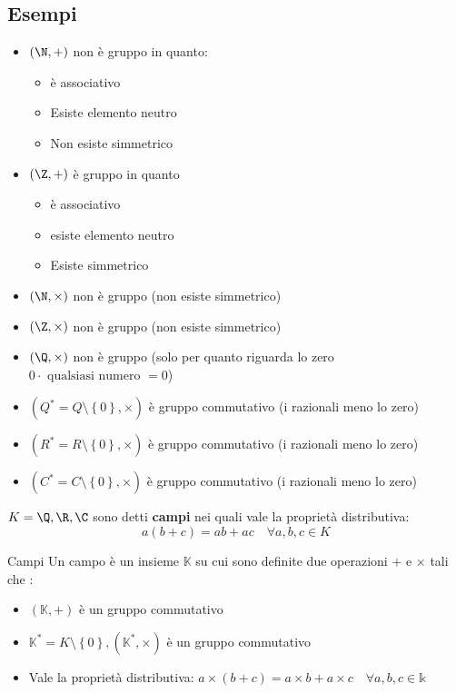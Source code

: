 \subsection{Esempi}
\label{sub:esempi}
\begin{itemize}
	\item $\left( \N, + \right) $ \rarr non è gruppo in quanto:
	      \begin{itemize}
		      \item è associativo
		      \item Esiste elemento neutro
		      \item Non esiste simmetrico
	      \end{itemize}
	      \item$ (\Z, +)$ \rarr è gruppo in quanto
	      \begin{itemize}
		      \item è associativo
		      \item esiste elemento neutro
		      \item Esiste simmetrico
	      \end{itemize}
	\item $ \left( \N, \times \right) $ \rarr non è gruppo (non esiste simmetrico)
	\item $\left( \Z, \times \right) $ \rarr non è gruppo (non esiste simmetrico)
	\item $ \left( \Q, \times \right) $ \rarr non è gruppo (solo per quanto riguarda lo zero $0 \cdot \text{ qualsiasi numero  }=0$)
	\item $\left( Q^* = Q \setminus \left\{ 0 \right\}, \times \right) $ \rarr è gruppo commutativo (i razionali meno lo zero)
	\item $\left( R^* = R \setminus \left\{ 0 \right\}, \times \right) $ \rarr è gruppo commutativo (i razionali meno lo zero)
	\item $\left( C^* = C \setminus \left\{ 0 \right\}, \times \right) $ \rarr è gruppo commutativo (i razionali meno lo zero)
\end{itemize}

\begin{tcolorbox}
	$K =  \Q, \R , \C$ sono detti \textbf{campi} nei quali vale la proprietà distributiva: \[
		a\left( b+c \right) = ab + ac \quad \forall a,b,c  \in K
	\]
\end{tcolorbox}

\begin{definizione}{Campi}
	Un campo è un insieme $ \mathbb{K} $ su cui sono definite due operazioni $ + $ e $\times$ tali che :
	\begin{itemize}
		\item $\left( \mathbb{K}, + \right) $ è un gruppo commutativo
		\item $ \mathbb{K} ^{*} = K \setminus \left\{ 0 \right\} , \left( \mathbb{K} ^{*}, \times \right) $ è un gruppo commutativo
		\item Vale la proprietà distributiva: $ a \times \left( b+c \right) = a \times b + a\times c \quad \forall a,b,c \in  \mathbb{k}$
	\end{itemize}
\end{definizione}

